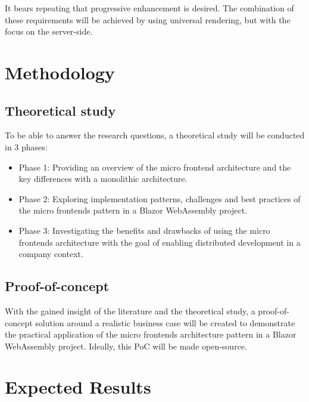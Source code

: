 It bears repeating that progressive enhancement is desired. The combination of
these requirements will be achieved by using universal rendering, but with the
focus on the server-side.





\section{Methodology}
\label{sec:methodology}

\subsection{Theoretical study}
To be able to answer the research questions, a theoretical study will be
conducted in 3 phases:
\begin{itemize}
    \item Phase 1: Providing an overview of the micro frontend architecture and
    the key differences with a monolithic architecture.
    \item Phase 2: Exploring implementation patterns, challenges and best
    practices of the micro frontends pattern in a Blazor WebAssembly project.
    \item Phase 3: Investigating the benefits and drawbacks of using the micro
    frontends architecture with the goal of enabling distributed development in
    a company context.
\end{itemize}

\subsection{Proof-of-concept}
With the gained insight of the literature and the theoretical study, a
proof-of-concept solution around a realistic business case will be created to
demonstrate the practical application of the micro frontends architecture
pattern in a Blazor WebAssembly project. Ideally, this PoC will be made
open-source.




\section{Expected Results}
\label{sec:expected-results}

